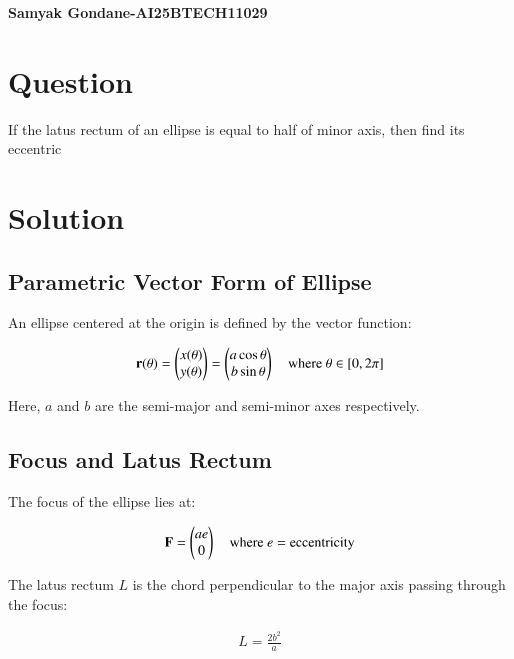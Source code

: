 \documentclass{article}
\begin{document}
\begin{center}
\large
    \textbf{Samyak Gondane-AI25BTECH11029}
\end{center}
\date{}

\section*{Question}
If the latus rectum of an ellipse is equal to half of minor axis, then find its eccentric

\section*{Solution}





\subsection*{Parametric Vector Form of Ellipse}

An ellipse centered at the origin is defined by the vector function:


\begin{align}
\mathbf{r}(\theta) =
\begin{pmatrix}
x(\theta) \\
y(\theta)
\end{pmatrix}
=
\begin{pmatrix}
a \cos \theta \\
b \sin \theta
\end{pmatrix}
\quad \text{where } \theta \in [0, 2\pi]
\end{align}



Here, $a$ and $b$ are the semi-major and semi-minor axes respectively.

\subsection*{Focus and Latus Rectum}

The focus of the ellipse lies at:


\begin{align}
\mathbf{F} = 
\begin{pmatrix}
ae \\
0
\end{pmatrix}
\quad \text{where } e = \text{eccentricity}
\end{align}



The latus rectum $L$ is the chord perpendicular to the major axis passing through the focus:


\begin{align}
L = \frac{2b^2}{a}
\end{align}
\end{document}
